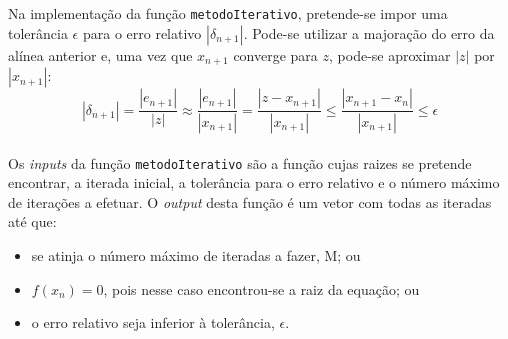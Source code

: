 Na implementação da função \texttt{metodoIterativo}, pretende-se impor uma tolerância \(\epsilon\) para o erro relativo \(|\delta_{n+1}|\). Pode-se utilizar a majoração do erro da alínea anterior e, uma vez que \(x_{n+1}\) converge para \(z\), pode-se aproximar \(|z|\) por \(|x_{n+1}|\):
\[
    \left| \delta_{n+1} \right|
    = \frac{\left|e_{n+1}\right|}{\left|z\right|}
    \approx \frac{\left|e_{n+1}\right|}{\left|x_{n+1}\right|}
    = \frac{\left|z - x_{n+1}\right|}{\left|x_{n+1}\right|}
    \leq \frac{\left|x_{n+1} - x_n\right|}{\left|x_{n+1}\right|}
    \leq \epsilon
\]


\paragraph{}
Os \textit{inputs} da função \texttt{metodoIterativo} são a função cujas raizes se pretende encontrar, a iterada inicial, a tolerância para o erro relativo e o número máximo de iterações a efetuar.
O \textit{output} desta função é um vetor com todas as iteradas até que:
\begin{itemize}
    \item se atinja o número máximo de iteradas a fazer, M; ou
    \item \(f(x_n)=0\), pois nesse caso encontrou-se a raiz da equação; ou
    \item o erro relativo seja inferior à tolerância, \(\epsilon\).
\end{itemize}